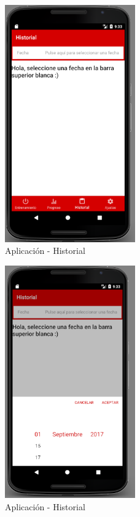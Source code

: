 \documentclass[a4paper, 11pt]{article}
\begin{document}
\begin{itemize}
              \begin{figure}[H]
               \centering
               \includegraphics[width=0.5\textwidth]{6historial}
               \caption{Aplicación - Historial}
               \label{f:app-historial}
              \end{figure}

              \begin{figure}[H]
               \centering
               \includegraphics[width=0.5\textwidth]{7historial-fecha}
               \caption{Aplicación - Historial}
               \label{f:app-historial-fecha}
              \end{figure}


\end{itemize}
\end{document}
